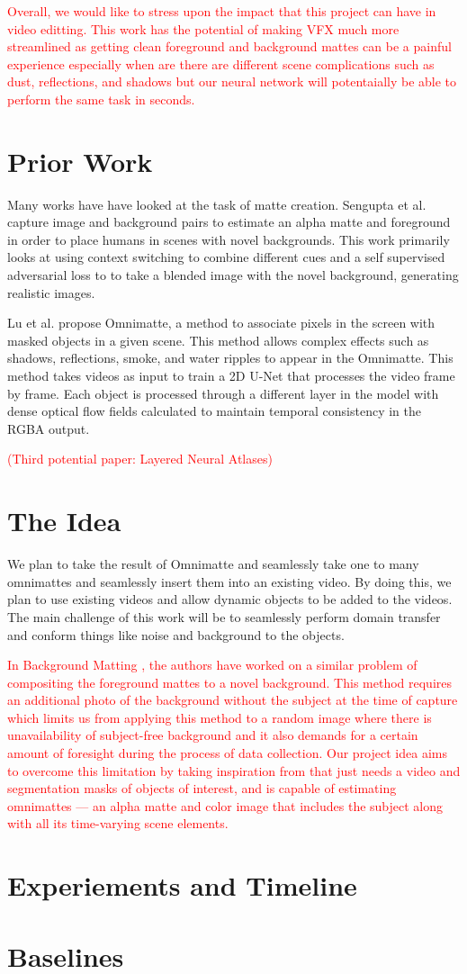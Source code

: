 \documentclass{article}
\begin{document}
\textcolor{red}{Overall, we would like to stress upon the impact that this project can have in video editting. This work has the potential of making VFX much more streamlined as getting clean foreground and background mattes can be a painful experience especially when are there are different scene complications such as dust, reflections, and shadows but our neural network will potentaially be able to perform the same task in seconds.}


\section{Prior Work}
Many works have have looked at the task of matte creation. Sengupta et al. \cite{BMSengupta20} capture image and background pairs to estimate an alpha matte and foreground in order to place humans in scenes with novel backgrounds. This work primarily looks at using context switching to combine different cues and a self supervised adversarial loss to to take a blended image with the novel background, generating realistic images.

Lu et al. \cite{lu2021} propose Omnimatte, a method to associate pixels in the screen with masked objects in a given scene. This method allows complex effects such as shadows, reflections, smoke, and water ripples to appear in the Omnimatte. This method takes videos as input to train a 2D U-Net that processes the video frame by frame. Each object is processed through a different layer in the model with dense optical flow fields calculated to maintain temporal consistency in the RGBA output.

\textcolor{red}{(Third potential paper: Layered Neural Atlases)}

\section{The Idea}
We plan to take the result of Omnimatte and seamlessly take one to many omnimattes and seamlessly insert them into an existing video. By doing this, we plan to use existing videos and allow dynamic objects to be added to the videos. The main challenge of this work will be to seamlessly perform domain transfer and conform things like noise and background to the objects.

\textcolor{red}{In Background Matting \cite{BMSengupta20}, the authors have worked on a similar problem of compositing the foreground mattes to a novel background.  This method requires an additional photo of the background without the subject at the time of capture which limits us from applying this method to a random image where there is unavailability of subject-free background and it also demands for a certain amount of foresight during the process of data collection. Our project idea aims to overcome this limitation by taking inspiration from \cite{lu2021} that just needs a video and segmentation masks of objects of interest, and is capable of estimating omnimattes — an alpha matte and color image that includes the subject along with all its time-varying scene elements.}

\section{Experiements and Timeline}

\section{Baselines}


\printbibliography
\end{document}
